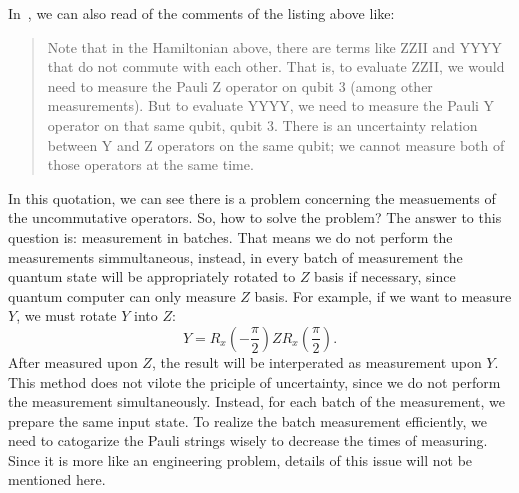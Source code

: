In~\cite{IBMQuantumVQE}, we can also read of the comments of the listing above like:
\begin{quote}
    Note that in the Hamiltonian above, there are terms like ZZII and YYYY that do not commute with each other. That is, to evaluate ZZII, we would need to measure the Pauli Z operator on qubit 3 (among other measurements). But to evaluate YYYY, we need to measure the Pauli Y operator on that same qubit, qubit 3. There is an uncertainty relation between Y and Z operators on the same qubit; we cannot measure both of those operators at the same time.
\end{quote}
In this quotation, we can see there is a problem concerning the measuements of the uncommutative operators. So, how to solve the problem? The answer to this question is: measurement in batches. That means we do not perform the measurements simmultaneous, instead, in every batch of measurement the quantum state will be appropriately rotated to $Z$ basis if necessary, since quantum computer can only measure $Z$ basis. For example, if we want to measure $Y$, we must rotate $Y$ into $Z$:
\[
Y = R_x\!\left(-\frac{\pi}{2}\right) Z R_x\!\left(\frac{\pi}{2}\right).
\]
After measured upon $Z$, the result will be interperated as measurement upon $Y$. This method does not vilote the priciple of uncertainty, since we do not perform the measurement simultaneously. Instead, for each batch of the measurement, we prepare the same input state. To realize the batch measurement efficiently, we need to catogarize the Pauli strings wisely to decrease the times of measuring. Since it is more like an engineering problem, details of this issue will not be mentioned here.

